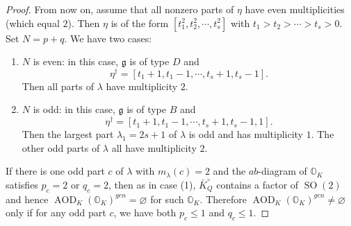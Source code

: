 \documentclass[11pt, a4paper]{amsart}
\newcommand{\orb}{\mathbb{O}}
\newcommand{\orbk}{\orb_{K}}
\newcommand{\fg}{\mathfrak{g}}
\DeclareMathOperator{\AOD}{AOD}
\newcommand{\AODK}{\AOD_K}
\newcommand{\SO}{\operatorname{SO}}
\theoremstyle{definition}
\numberwithin{equation}{section}
\begin{document}
\begin{proof}
	From now on, assume that all nonzero parts of $\eta$ have even multiplicities (which equal $2$). Then $\eta$ is of the form $[t_1^2, t_2^2, \cdots, t_s^2]$ with $t_1 > t_2 > \cdots > t_s > 0$. Set $N=p+q$. We have two cases:
	\begin{enumerate}[label=(\Roman*), itemindent=*, leftmargin=*]
		\item $N$ is even: in this case, $\fg$ is of type $D$ and 
			\[ \eta^\dagger = [t_1+1, t_1-1, \cdots, t_s+1, t_s-1]. \] 
			Then all parts of $\lambda$ have multiplicity $2$.
		\item $N$ is odd: in this case, $\fg$ is of type $B$ and 
			\[ \eta^\dagger = [t_1+1, t_1-1, \cdots, t_s+1, t_s-1, 1]. \] 
			Then the largest part $\lambda_1 = 2s + 1$ of $\lambda$ is odd and has multiplicity $1$. The other odd parts of $\lambda$ all have multiplicity $2$.
	\end{enumerate}

	If there is one odd part $c$ of $\lambda$ with $m_\lambda(c) = 2$ and the $ab$-diagram of $\orbk$ satisfies $p_c=2$ or $q_c=2$, then as in case (1), $\bar{K}_Q^\circ$ contains a factor of $\SO(2)$ and hence $\AODK(\orbk)^{gen} = \varnothing$ for such $\orbk$. Therefore $\AODK(\orbk)^{gen} \neq \varnothing$ only if for any odd part $c$, we have both $p_c \leqslant 1$ and $q_c \leqslant 1$. %


\end{proof}
\end{document}
